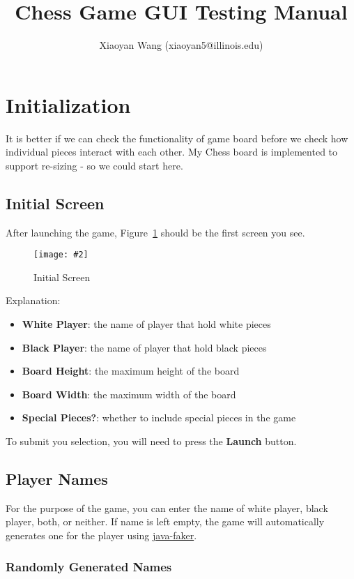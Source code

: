 \documentclass[12pt]{article}
\title{Chess Game GUI Testing Manual}
\author{Xiaoyan Wang (xiaoyan5@illinois.edu)}
\newcommand{\img}[3]{
\begin{figure}[!ht]
\begin{center}
\texttt{[image: \#2]}
\caption{#3}\label{#2}
\end{center}
\end{figure}
}
\newcommand{\B}[1]{\textbf{#1}}
\begin{document}
\maketitle

\section{Initialization}

It is better if we can check the functionality of game board before
we check how individual pieces interact with each other. My Chess board
is implemented to support re-sizing - so we could start here.

\subsection{Initial Screen}

After launching the game, Figure~\ref{init_empty} should be the first screen you see.
\img{0.7}{init_empty}{Initial Screen}

\noindent Explanation:
\begin{itemize}
    \item \B{White Player}: the name of player that hold white pieces
    \item \B{Black Player}: the name of player that hold black pieces
    \item \B{Board Height}: the maximum height of the board
    \item \B{Board Width}: the maximum width of the board
    \item \B{Special Pieces?}: whether to include special pieces in the game
\end{itemize}

To submit you selection, you will need to press the \B{Launch} button.


\subsection{Player Names}

For the purpose of the game, you can enter the name of white player, black player, both, or neither. If name is left empty, the game will automatically generates one for the player using \href{https://github.com/DiUS/java-faker}{java-faker}.

\subsubsection{Randomly Generated Names}
\end{document}
